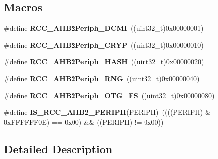 \subsection*{Macros}
\begin{DoxyCompactItemize}
\item 
\mbox{\label{group___r_c_c___a_h_b2___peripherals_ga514e63d5f3ced29ca4014d84e269ea6e}} 
\#define {\bfseries R\+C\+C\+\_\+\+A\+H\+B2\+Periph\+\_\+\+D\+C\+MI}~((uint32\+\_\+t)0x00000001)
\item 
\mbox{\label{group___r_c_c___a_h_b2___peripherals_ga99893bb6ef0cc504fbbc6236ae883410}} 
\#define {\bfseries R\+C\+C\+\_\+\+A\+H\+B2\+Periph\+\_\+\+C\+R\+YP}~((uint32\+\_\+t)0x00000010)
\item 
\mbox{\label{group___r_c_c___a_h_b2___peripherals_gad235f25cf07339b1486e95adf4e2111c}} 
\#define {\bfseries R\+C\+C\+\_\+\+A\+H\+B2\+Periph\+\_\+\+H\+A\+SH}~((uint32\+\_\+t)0x00000020)
\item 
\mbox{\label{group___r_c_c___a_h_b2___peripherals_gae6c14647792757c0b3a4339c74f9ce96}} 
\#define {\bfseries R\+C\+C\+\_\+\+A\+H\+B2\+Periph\+\_\+\+R\+NG}~((uint32\+\_\+t)0x00000040)
\item 
\mbox{\label{group___r_c_c___a_h_b2___peripherals_ga95977679051aa7428d823404bff63aea}} 
\#define {\bfseries R\+C\+C\+\_\+\+A\+H\+B2\+Periph\+\_\+\+O\+T\+G\+\_\+\+FS}~((uint32\+\_\+t)0x00000080)
\item 
\mbox{\label{group___r_c_c___a_h_b2___peripherals_ga90f3f337a5f503e36280ab4504d31c39}} 
\#define {\bfseries I\+S\+\_\+\+R\+C\+C\+\_\+\+A\+H\+B2\+\_\+\+P\+E\+R\+I\+PH}(P\+E\+R\+I\+PH)~((((P\+E\+R\+I\+PH) \& 0x\+F\+F\+F\+F\+F\+F0\+E) == 0x00) \&\& ((\+P\+E\+R\+I\+P\+H) != 0x00))
\end{DoxyCompactItemize}


\subsection{Detailed Description}
